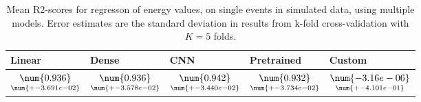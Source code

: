 \begin{table}
\centering
\caption{
Mean R2-scores for regresson of energy values, on single events in simulated data, using multiple models. 
Error estimates are the standard deviation in results from k-fold cross-validation 
with $K=5$ folds.
}
\label{tab:regression-simulated-single-energy-r2}
\begin{tabular}{lllll}
\toprule
                                             Linear &                                               Dense &                                                 CNN &                                          Pretrained &                                                  Custom \\
\midrule
 $\underset{\num{+- 3.691e-02 }  }{\num{ 0.936 } }$ &  $\underset{\num{+- 3.578e-02 }  }{\num{ 0.936 } }$ &  $\underset{\num{+- 3.440e-02 }  }{\num{ 0.942 } }$ &  $\underset{\num{+- 3.734e-02 }  }{\num{ 0.932 } }$ &  $\underset{\num{+- 4.101e-01 }  }{\num{ -3.16e-06 } }$ \\
\bottomrule
\end{tabular}
\end{table}

